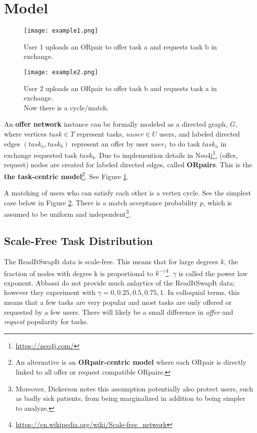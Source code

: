 \documentclass[main.tex]{subfiles}
\begin{document}
\section{Model}

\begin{figure}
  \texttt{[image: example1.png]}
  \caption{User 1 uploads an ORpair to offer task a and requests task b in exchange.}
  \label{example1}
\end{figure}

\begin{figure}
  \texttt{[image: example2.png]}
  \caption{User 2 uploads an ORpair to offer task b and requests task a in exchange.
           \\Now there is a cycle/match.}
  \label{example2}
\end{figure}

An \textbf{offer network} instance can be formally modeled as a directed graph, $G$, where vertices $task \in T$ represent tasks, $uuser \in U$ users, and labeled directed edges $(task_a,task_b)$ represent an offer by user $user_1$ to do task $task_a$ in exchange requested task $task_b$. Due to implemention details in Neo4j\footnote{\url{https://neo4j.com/}}, (offer, request) nodes are created for labeled directed edges, called \textbf{ORpairs}. This is the \textbf{the task-centric model}\footnote{An alternative is an \textbf{ORpair-centric model} where each ORpair is directly linked to all offer or request compatible ORpairs.}.  See Figure \ref{example1}.

A matching of users who can satisfy each other is a vertex cycle. See the simplest case below in Figure \ref{example2}. There is a match acceptance probability $p$, which is assumed to be uniform and independent\footnote{Moreover, Dickerson \cite{Dick} notes this assumption potentially also protect users, such as badly sick patients, from being marginalized in addition to being simpler to analyze.}.

\subsection{Scale-Free Task Distribution}
The ReadItSwapIt data is scale-free. This means that for large degrees $k$, the fraction of nodes with degree k is proportional to $k^{-\gamma}$\footnote{\url{https://en.wikipedia.org/wiki/Scale-free_network}}. $\gamma$ is called the power law exponent. Abbassi \cite{Abb2} do not provide much anlaytics of the ReadItSwapIt data; however they experiment with $\gamma = {0,0.25,0.5,0.75,1}$. In colloquial terms, this means that a few tasks are very popular and most tasks are only offered or requested by a few users. There will likely be a small difference in \textit{offer} and \textit{request} popularity for tasks.
\end{document}
